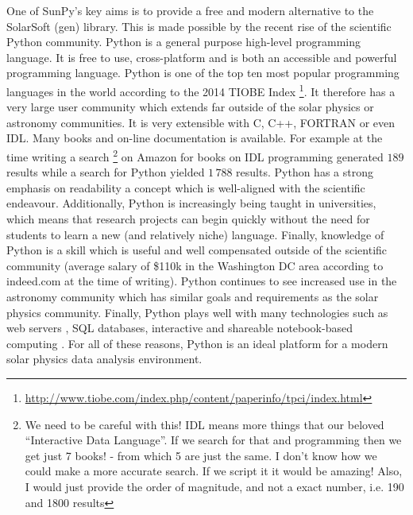 One of SunPy's key aims is to provide a free and modern alternative 
to the SolarSoft (gen) library. This is made possible by the recent 
rise of the scientific Python community. Python is a general purpose 
high-level programming language. It is free to use, cross-platform 
and is both an accessible and powerful programming language. Python 
is one of the top ten most popular programming languages in the world 
according to the 2014 TIOBE Index 
\footnote{\url{http://www.tiobe.com/index.php/content/paperinfo/tpci/index.html}}.
It therefore has a very large user community which extends far outside 
of the solar physics or astronomy communities. It is very extensible 
with C, C++, FORTRAN or even IDL. Many books and on-line 
documentation is available. For example at the time writing a search
\footnote{We need to be careful with this! IDL means more things that
our beloved ``Interactive Data Language''. If we search for that
and programming then we get just 7 books! - from which 5 are just the same.
I don't know how we could make a more accurate search.
If we script it it would be amazing!  Also, I would just provide the order
of magnitude, and not a exact number, i.e. 190 and 1800 results} 
on Amazon for books on IDL programming generated $189$ results while 
a search for Python yielded $1\,788$ results. Python has a strong 
emphasis on readability a concept which is well-aligned with the 
scientific endeavour.
Additionally, Python is increasingly being taught in universities,
which means that research projects can begin quickly 
without the need for students to learn a new (and relatively niche) 
language. Finally, knowledge of Python is a skill which is useful and well 
compensated outside of the scientific community (average salary of 
\$110k in the Washington DC area according to indeed.com at the time 
of writing). Python continues to see increased use in the astronomy 
community \cite{greenfield2011} which has similar goals and 
requirements as the solar physics community. Finally, Python plays 
well with many technologies such as web servers \cite{dolgert2008}, 
SQL databases, interactive and shareable notebook-based computing 
\cite{perez2007}. For all of these reasons, Python is an ideal 
platform for a modern solar physics data analysis environment.

